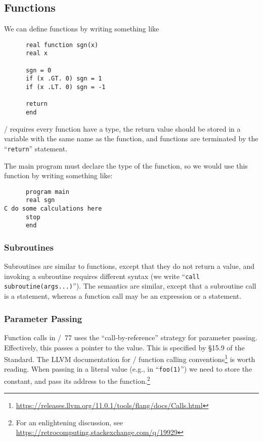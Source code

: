 \subsection{Functions}
We can define functions by writing something like

\begin{lstlisting}
      real function sgn(x)
      real x

      sgn = 0
      if (x .GT. 0) sgn = 1
      if (x .LT. 0) sgn = -1

      return
      end
\end{lstlisting}
\FORTRAN/ requires every function have a type, the return value should
be stored in a variable with the same name as the function, and
functions are terminated by the ``\texttt{return}'' statement.

The main program must declare the type of the function, so we would use
this function by writing something like:
\begin{lstlisting}
      program main
      real sgn
C do some calculations here
      stop
      end
\end{lstlisting}

\subsubsection{Subroutines}
Subroutines are similar to functions, except that they do not return a
value, and invoking a subroutine requires different syntax (we write
``\texttt{call subroutine(args...)}''). The semantics are similar,
except that a subroutine call is a statement, whereas a function call
may be an expression or a statement.

\subsubsection{Parameter Passing}
Function calls in \FORTRAN/~77 uses the ``call-by-reference'' strategy
for parameter passing. Effectively, this passes a pointer to the value.
This is specified by \S15.9 of the Standard. The LLVM documentation for
\FORTRAN/ function calling
conventions\footnote{\url{https://releases.llvm.org/11.0.1/tools/flang/docs/Calls.html}}
is worth reading. When passing in a literal value (e.g., in ``\texttt{foo(1)}'')
we need to store the constant, and pass its address to the
function.\footnote{For an enlightening discussion, see \url{https://retrocomputing.stackexchange.com/q/19929}}

